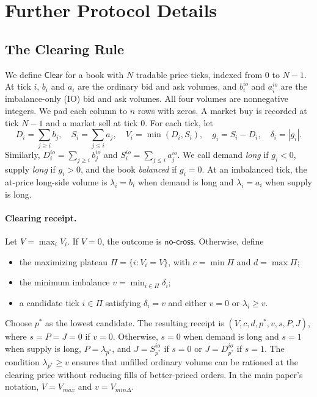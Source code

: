 

\section{Further Protocol Details}
\label{app:zq-protocol}

\subsection{The Clearing Rule}
\label{app:zq-clearing-rule}

We define \(\mathsf{Clear}\) for a book with \(N\) tradable price ticks, indexed from \(0\) to \(N-1\). At tick \(i\), \(b_i\) and \(a_i\) are the ordinary bid and ask volumes, and \(b_i^{io}\) and \(a_i^{io}\) are the imbalance-only (IO) bid and ask volumes. All four volumes are nonnegative integers. We pad each column to \(n\) rows with zeros. A market buy is recorded at tick \(N-1\) and a market sell at tick \(0\). For each tick, let
\[
D_i=\sum_{j\ge i}b_j,\quad S_i=\sum_{j\le i}a_j,\quad
V_i=\min(D_i,S_i),\quad g_i=S_i-D_i,\quad \delta_i=|g_i|.
\]
Similarly, \(D_i^{io}=\sum_{j\ge i}b_j^{io}\) and \(S_i^{io}=\sum_{j\le i}a_j^{io}\). We call demand \emph{long} if \(g_i<0\), supply \emph{long} if \(g_i>0\), and the book \emph{balanced} if \(g_i=0\). At an imbalanced tick, the at-price long-side volume is \(\lambda_i=b_i\) when demand is long and \(\lambda_i=a_i\) when supply is long.

\paragraph{Clearing receipt.} Let \(V=\max_i V_i\). If \(V=0\), the outcome is \(\textsf{no-cross}\). Otherwise, define
\begin{itemize}
\item the maximizing plateau \(\Pi=\{i:V_i=V\}\), with \(c=\min\Pi\) and \(d=\max\Pi\);
\item the minimum imbalance \(v=\min_{i\in\Pi}\delta_i\);
\item a candidate tick \(i\in\Pi\) satisfying \(\delta_i=v\) and either \(v=0\) or \(\lambda_i\ge v\).
\end{itemize}
Choose \(p^*\) as the lowest candidate. The resulting receipt is \((V,c,d,p^*,v,s,P,J)\), where \(s=P=J=0\) if \(v=0\). Otherwise, \(s=0\) when demand is long and \(s=1\) when supply is long, \(P=\lambda_{p^*}\), and \(J=S_{p^*}^{io}\) if \(s=0\) or \(J=D_{p^*}^{io}\) if \(s=1\). The condition \(\lambda_{p^*}\ge v\) ensures that unfilled ordinary volume can be rationed at the clearing price without reducing fills of better-priced orders. In the main paper's notation, \(V=V_{max}\) and \(v=V_{min\Delta}\).

